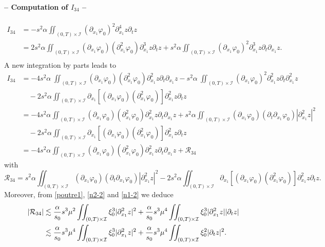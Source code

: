 \documentclass[a4paper, 12pt]{article}
\theoremstyle{plain}
\theoremstyle{definition}
\numberwithin{theorem}{section}
\numberwithin{equation}{section}
\begin{document}
{\paragraph{-- Computation of $I_{34}$ --}
\begin{align*}
I_{34}&=-s^2\alpha\iint_{(0,T)\times\mathcal{I}}(\partial_{x_1}\varphi_0)^2\partial^4_{x_1}z\partial_tz\\
&=2s^2\alpha\iint_{(0,T)\times\mathcal{I}}(\partial_{x_1}\varphi_0)(\partial_{x_1}^2\varphi_0)\partial^3_{x_1}z\partial_tz+s^2\alpha\iint_{(0,T)\times\mathcal{I}}(\partial_{x_1}\varphi_0)^2\partial^3_{x_1}z\partial_t\partial_{x_1}z.\\
\end{align*}
A new integration by parts leads to 
\begin{align*}
I_{34}&=-4s^2\alpha~\iint_{(0,T)\times\mathcal{I}}(\partial_{x_1}\varphi_0)(\partial_{x_1}^2\varphi_0)\partial^2_{x_1}z\partial_t\partial_{x_1}z-s^2\alpha~\iint_{(0,T)\times\mathcal{I}}(\partial_{x_1}\varphi_0)^2\partial^2_{x_1}z\partial_t\partial_{x_1}^2z\\
&\quad -2s^2\alpha\iint_{(0,T)\times\mathcal{I}}\partial_{x_1}[(\partial_{x_1}\varphi_0)(\partial_{x_1}^2\varphi_0)]\partial^2_{x_1}z\partial_tz\\
&=-4s^2\alpha\iint_{(0,T)\times\mathcal{I}}(\partial_{x_1}\varphi_0)(\partial_{x_1}^2\varphi_0)\partial^2_{x_1}z\partial_t\partial_{x_1}z+s^2\alpha\iint_{(0,T)\times\mathcal{I}}(\partial_{x_1}\varphi_0)(\partial_t\partial_{x_1}\varphi_0)|\partial^2_{x_1}z|^2\\
&\quad -2s^2\alpha\iint_{(0,T)\times\mathcal{I}}\partial_{x_1}[(\partial_{x_1}\varphi_0)(\partial_{x_1}^2\varphi_0)]\partial^2_{x_1}z\partial_tz\\
&=-4s^2\alpha\iint_{(0,T)\times\mathcal{I}}(\partial_{x_1}\varphi_0)(\partial_{x_1}^2\varphi_0)\partial^2_{x_1}z\partial_t\partial_{x_1}z+\mathcal{R}_{34}
\end{align*}
with
$$
\mathcal{R}_{34}=s^2\alpha\iint_{(0,T)\times\mathcal{I}}(\partial_{x_1}\varphi_0)(\partial_t\partial_{x_1}\varphi_0)|\partial^2_{x_1}z|^2-2s^2\alpha\iint_{(0,T)\times\mathcal{I}}\partial_{x_1}[(\partial_{x_1}\varphi_0)(\partial_{x_1}^2\varphi_0)]\partial^2_{x_1}z\partial_tz.
$$
Moreover, from \eqref{poutre1}, \eqref{n2-2} and \eqref{n1-2} we deduce
\begin{align}\notag
|\mathcal{R}_{34}|&\lesssim \frac{\alpha}{s_0}s^3\mu^2\iint_{(0,T)\times\mathcal{I}}\xi_0^{3}|\partial^2_{x_1}z|^2+\frac{\alpha}{s_0}s^3\mu^4\iint_{(0,T)\times\mathcal{I}}\xi_0^3|\partial^2_{x_1}z||\partial_tz|\\
&\lesssim \frac{\alpha}{s_0}s^3\mu^4\iint_{(0,T)\times\mathcal{I}}\xi_0^{3}|\partial^2_{x_1}z|^2+\frac{\alpha}{s_0}s^3\mu^4\iint_{(0,T)\times\mathcal{I}}\xi_0^2|\partial_tz|^2. \label{EstR34}
\end{align}
}
\end{document}
